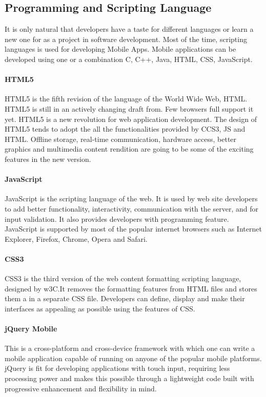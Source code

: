 \subsection{Programming and Scripting Language}
It is only natural that developers have a taste for different languages or
learn a new one for as a project in software development. Most of the time,
scripting languages is used for developing Mobile Apps. Mobile applications
can be developed using one or a combination C, C++, Java, HTML, CSS, JavaScript.
\paragraph{HTML5}

HTML5 is the fifth revision of the language of the World Wide Web, HTML.
 HTML5 is still in an actively changing draft from. Few browsers full
 support it yet. HTML5 is a new revolution for web application development.
 The design of HTML5 tends to adopt the all the functionalities provided
 by CCS3, JS and HTML.  Offline storage, real-time communication, hardware
 access, better graphics and multimedia content rendition are going to be
 some of the exciting features in the new version.

 \paragraph{JavaScript}
 JavaScript is the scripting language of the web.
 It is used by web site developers to add better
 functionality, interactivity, communication with the
 server, and for input validation. It also provides developers
 with programming feature. JavaScript is supported by most of
 the popular internet browsers such as Internet Explorer, Firefox,
 Chrome, Opera and Safari.
 \paragraph{CSS3}
 CSS3 is the third version of the web content formatting scripting language,
 designed by w3C.It removes the formatting features from HTML files and
 stores them a in a separate CSS file.
Developers can define, display and make their interfaces as appealing
as possible using the features of CSS.
\paragraph{jQuery Mobile}
This is a cross-platform and cross-device framework with which one can write
a mobile application capable of running on anyone of the popular mobile platforms.
jQuery is fit for developing applications with touch input, requiring
less processing power and  makes this possible through a lightweight code
built with progressive enhancement and flexibility in mind.


